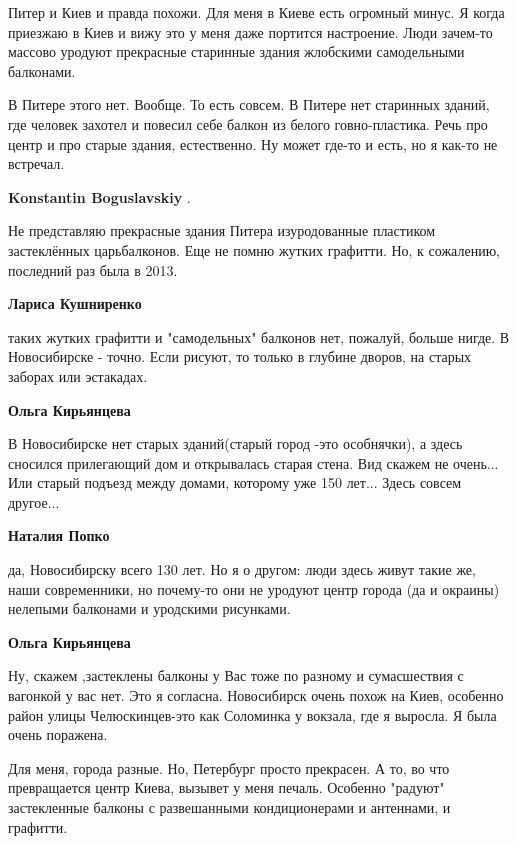 \begin{itemize}

Питер и Киев и правда похожи. Для меня в Киеве есть огромный минус. Я когда
приезжаю в Киев и вижу это у меня даже портится настроение. Люди зачем-то
массово уродуют прекрасные старинные здания жлобскими самодельными балконами.

В Питере этого нет. Вообще. То есть совсем. В Питере нет старинных зданий, где
человек захотел и повесил себе балкон из белого говно-пластика. Речь про центр
и про старые здания, естественно. Ну может где-то и есть, но я как-то не
встречал.

\begin{itemize} %
\textbf{Konstantin Boguslavskiy} . 

Не представляю прекрасные здания Питера изуродованные пластиком застеклённых
царьбалконов. Еще не помню жутких графитти. Но, к сожалению, последний раз была
в 2013.

\begin{itemize} %
\textbf{Лариса Кушниренко} 

таких жутких графитти и "самодельных" балконов нет, пожалуй, больше нигде. В
Новосибирске - точно. Если рисуют, то только в глубине дворов, на старых
заборах или эстакадах.

\textbf{Ольга Кирьянцева} 

В Новосибирске нет старых зданий(старый город -это особнячки), а здесь сносился
прилегающий дом и открывалась старая стена. Вид скажем не очень... Или старый
подъезд между домами, которому уже 150 лет... Здесь совсем другое...

\textbf{Наталия Попко} 

да, Новосибирску всего 130 лет. Но я о другом: люди здесь живут такие же, наши
современники, но почему-то они не уродуют центр города (да и окраины) нелепыми
балконами и уродскими рисунками.

\textbf{Ольга Кирьянцева} 

Ну, скажем ,застеклены балконы у Вас тоже по разному и сумасшествия с вагонкой у
вас нет. Это я согласна. Новосибирск очень похож на Киев, особенно район улицы
Челюскинцев-это как Соломинка у вокзала, где я выросла. Я была очень поражена.

\end{itemize} %


Для меня, города разные. Но, Петербург просто прекрасен. А то, во что
превращается центр Киева, вызывет у меня печаль. Особенно "радуют" застекленные
балконы с развешанными кондиционерами и антеннами, и графитти.


\end{itemize}
\end{itemize}
